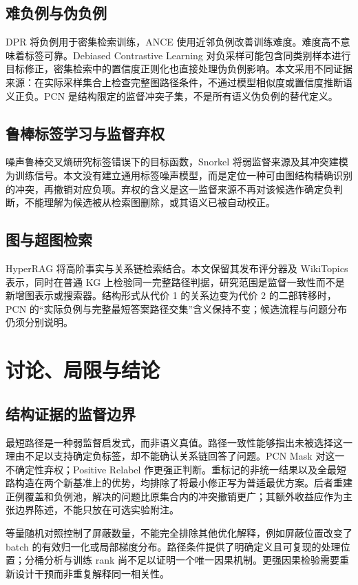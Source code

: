 \documentclass[UTF8,a4paper,10pt,fontset=fandol]{ctexart}
\begin{document}
\subsection{难负例与伪负例}
DPR 将负例用于密集检索训练，ANCE 使用近邻负例改善训练难度\cite{dpr,ance}。难度高不意味着标签可靠。Debiased Contrastive Learning 对负采样可能包含同类别样本进行目标修正\cite{debiased}，密集检索中的置信度正则化也直接处理伪负例影响\cite{false_negative}。本文采用不同证据来源：在实际采样集合上检查完整图路径条件，不通过模型相似度或置信度推断语义正负。PCN 是结构限定的监督冲突子集，不是所有语义伪负例的替代定义。

\subsection{鲁棒标签学习与监督弃权}
噪声鲁棒交叉熵研究标签错误下的目标函数\cite{gce}，Snorkel 将弱监督来源及其冲突建模为训练信号\cite{snorkel}。本文没有建立通用标签噪声模型，而是定位一种可由图结构精确识别的冲突，再撤销对应负项。弃权的含义是这一监督来源不再对该候选作确定负判断，不能理解为候选被从检索图删除，或其语义已被自动校正。

\subsection{图与超图检索}
HyperRAG 将高阶事实与关系链检索结合\cite{hyperrag}。本文保留其发布评分器及 WikiTopics 表示，同时在普通 KG 上检验同一完整路径判据，研究范围是监督一致性而不是新增图表示或搜索器。结构形式从代价 1 的关系边变为代价 2 的二部转移时，PCN 的“实际负例与完整最短答案路径交集”含义保持不变；候选流程与问题分布仍须分别说明。

\section{讨论、局限与结论}
\subsection{结构证据的监督边界}
最短路径是一种弱监督启发式，而非语义真值。路径一致性能够指出未被选择这一理由不足以支持确定负标签，却不能确认关系链回答了问题。PCN Mask 对这一不确定性弃权；Positive Relabel 作更强正判断。重标记的非统一结果以及全最短路构造在两个新基准上的优势，均排除了将最小修正写为普适最优方案。后者重建正例覆盖和负例池，解决的问题比原集合内的冲突撤销更广；其额外收益应作为主张边界陈述，不能只放在可选实验附注。

等量随机对照控制了屏蔽数量，不能完全排除其他优化解释，例如屏蔽位置改变了 batch 的有效归一化或局部梯度分布。路径条件提供了明确定义且可复现的处理位置；分桶分析与训练 rank 尚不足以证明一个唯一因果机制。更强因果检验需要重新设计干预而非重复解释同一相关性。
\end{document}
